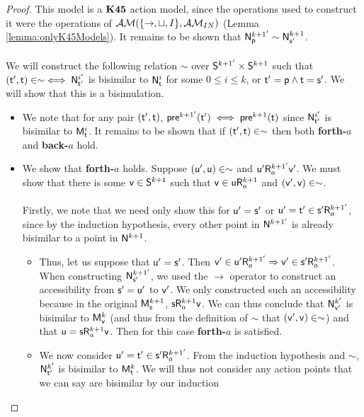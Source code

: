 \begin{proof}
  This model is a $\AXKFF$ action model, since the operations used to construct
	it were the operations of $\EM(\{\to,\sqcup,I\},\insaneClass)$ (Lemma \ref{lemma:onlyK45Models}).
  It remains to be shown that $\evM^{k+1'}_{\evp} \sim \evM^{k+1}_{\evs'}$.\\
  \\
  We will construct the following relation $\sim$ over $\evS^{k+1'} \times
  \evS^{k+1}$ such that $(\evt',\evt) \in \sim \iff \evM^{i'}_{\evt'}$ is bisimilar to
	$\evM^{i}_{\evt}$ for some $0 \leq i \leq k$, or $\evt' = \evp \land \evt =
  \evs'$.
  We will show that this is a bisimulation.
	\begin{itemize}
		\item We note that for any pair $(\evt',\evt)$, $\evpr^{k+1'}(\evt') \iff
  \evpr^{k+1}(\evt)$ since $\evM^{i'}_{\evt'}$ is bisimilar to $\evMM^{i}_{\evt}$.
  It remains to be shown that if $(\evt', \evt) \in \sim$ then both {\bf
  forth-$a$} and {\bf back-$a$} hold.
		\item We show that {\bf forth-$a$} holds.
	Suppose $(\evu',\evu) \in \sim$ and $\evu' \evR^{k+1'}_a \evv'$.
	We must show that there is some $\evv \in \evS^{k+1}$ such that $\evv \in \evu \evR^{k+1}_a$ and
	$(\evv',\evv) \in \sim$.\\
	\\
	Firstly, we note that we need only show this for $\evu' = \evs'$ or $\evu' = \evt' \in \evs'
	\evR^{k+1'}_a$, since by
	the induction hypothesis, every other point in $\evM^{k+1'}$ is already bisimilar to a point in
	$\evM^{k+1}$.
	\begin{itemize}
		\item Thus, let us suppose that $\evu' = \evs'$.
	Then $\evv' \in \evu' \evR^{k+1'}_a \Rightarrow \evv' \in \evs' \evR^{k+1'}_a$.
	When constructing $\evM^{k+1'}_{\evs'}$, we used the $\to$ operator to construct an accessibility
	from $\evs' = \evu'$ to $\evv'$.
	We only constructed such an accessibility because in the original $\evMM^{k+1}_\evs$, $\evs
	\evR^{k+1}_a \evv$.
	We can thus conclude that $\evM^{k'}_{\evv'}$ is bisimilar to $\evMM^k_\evv$ (and thus from the
	definition of $\sim$ that $(\evv',\evv) \in \sim$) and that $\evu = \evs \evR^{k+1}_a \evv$.
	Then for this case {\bf forth-$a$} is satisfied.
		\item We now consider $\evu' = \evt' \in \evs' \evR^{k+1'}_a$.
	From the induction hypothesis and $\sim$, $\evM^{k'}_{\evt'}$ is bisimilar to $\evMM^{k}_{\evt}$.
	We will thus not consider any action points that we can say are bisimilar by our induction

\end{itemize}
\end{itemize}
\end{proof}
